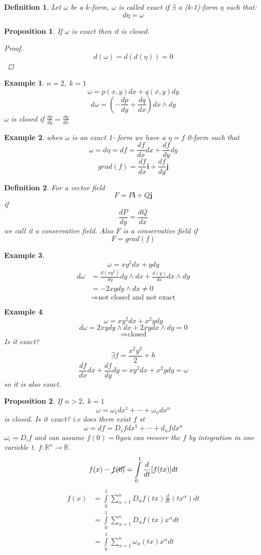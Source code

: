 \documentclass[12pt]{article}
\def\RR{\mathbb{R}}
\newtheorem{definition}{Definition}[section]
\newtheorem{example}{Example}[section]
\newtheorem{proposition}{Proposition}[section]
\begin{document}
\begin{definition}
Let $\omega$ be a $k$-form, $\omega$ is called exact if $\exists$ a (k-1)-form $\eta$ such that:
\[ d\eta = \omega \]
\end{definition}

\begin{proposition}
If $\omega$ is exact then it is closed.
\begin{proof}
\[d(\omega) = d(d(\eta)) = 0\]
\end{proof}
\end{proposition}

\begin{example}
$n=2,\;k=1$
\[\omega = p(x,y)dx + q(x,y)dy\]
\[d\omega = \left(-\frac{dp}{dy} + \frac{dq}{dx}\right)dx\wedge dy\]
$\omega$ is closed if $\frac{dp}{dy} = \frac{dq}{dx}$
\end{example}

\begin{example}
when $\omega$ is an exact 1- form we have a $\eta = f$ 0-form such that
\[\omega = d\eta = df = \frac{df}{dx}dx + \frac{df}{dy}dy\]
\[grad(f) =  \frac{df}{dx}\mathbf{i} + \frac{df}{dy}\mathbf{j}\]
\end{example}
\begin{definition}
For a vector field 
\[F=P\mathbf{i} + Q\mathbf{j}\]
if
\[\frac{dP}{dy} = \frac{dQ}{dx}\]
we call it a conservative field. Also $F$ is a conservative field if
\[F = grad(f)\]
\end{definition}

\begin{example}
\[\omega = xy^2dx + ydy\]
\begin{align*}
d\omega &= \frac{d(xy^2)}{dy}dy\wedge dx + \frac{d(y)}{dx}dx\wedge dy\\
&= -2xydy\wedge dx \neq 0 \end{align*}
\[\Rightarrow \text{not closed and not exact}\] 
\end{example}

\begin{example}
\[\omega = xy^2dx + x^2ydy\]
\[d\omega = 2xydy\wedge dx + 2xydx\wedge dy = 0 \]
\[\Rightarrow \text{closed}\] 
Is it exact?
\[\exists f=\frac{x^2y^2}{2} +h\]
\[\frac{df}{dx}dx + \frac{df}{dy}dy = xy^2dx + x^2ydy =\omega\]
so it is also exact.
\end{example}

\begin{proposition}
If $n>2, \; k=1$ 
\[\omega = \omega_1dx^1 + \cdots + \omega_ndx^n\]
is closed. Is it exact? i.e does there exist $f$ st
\[\omega = df = D_1fdx^1 + \cdots + d_nfdx^n\]
$ \omega_i = D_if$ and can assume $f(0)=0$you can recover the $f$ by integration in one variable t. $f:\RR^n \rightarrow \RR$.
\[f(x) -\cancel{f(0)} = \int\limits_{0}^1\frac{d}{dt}[f(tx)]dt\]
\begin{align*}
f(x) &= \int\limits_{0}^1\sum\limits_{\alpha=1}^nD_\alpha f(tx)\frac{d}{dt}(tx^\alpha)dt\\
 &= \int\limits_{0}^1\sum\limits_{\alpha=1}^nD_\alpha f(tx)x^\alpha dt\\
&= \int\limits_{0}^1\sum\limits_{\alpha=1}^n\omega_\alpha(tx)x^\alpha dt
\end{align*}
\end{proposition}
\end{document}
